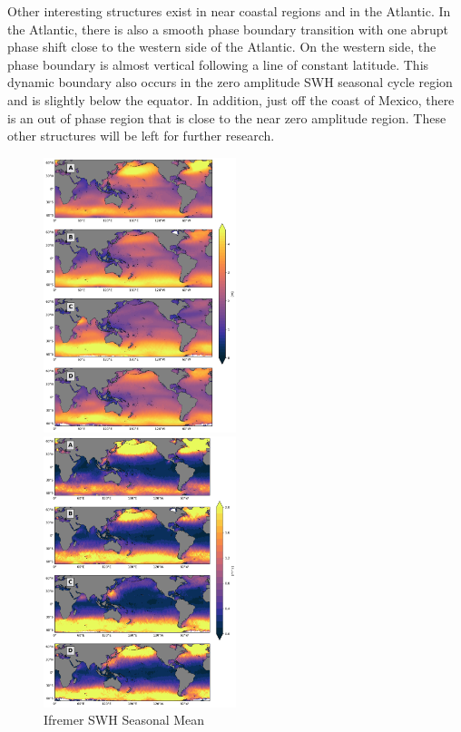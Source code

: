 \documentclass[draft,linenumbers]{agujournal2018}
\begin{document}
Other interesting structures exist in near coastal regions and in the Atlantic. In the Atlantic, there is also a smooth phase boundary transition with one abrupt phase shift close to the western side of the Atlantic. On the western side, the phase boundary is almost vertical following a line of constant latitude. This dynamic boundary also occurs in the zero amplitude SWH seasonal cycle region and is slightly below the equator. In addition, just off the coast of Mexico, there is an out of phase region that is close to the near zero amplitude region. These other structures will be left for further research.

\begin{figure}[tbh]
\centering
  \begin{minipage}{.5\textwidth}
    \centering
    \includegraphics[width=0.5\textwidth]{figs/statistical_moments/Ifremer_p1_seasonal_mean.png}
    \caption{Ifremer SWH Seasonal Mean}
    \label{Ifremer_swh_seasonal_mean}
  \end{minipage}%
  \begin{minipage}{.5\textwidth}
    \centering
    \includegraphics[width=0.5\textwidth]{figs/statistical_moments/Ifremer_p1_seasonal_var.png}

\end{minipage}
\end{figure}
\end{document}

